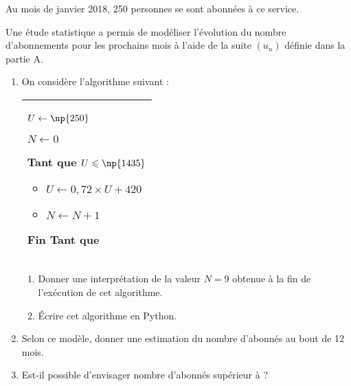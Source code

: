 \documentclass[12pt,a4paper]{article}
\theoremstyle{break}
\begin{document}
	Au mois de janvier 2018, 250 personnes se sont abonnées à ce service.
	
	Une étude statistique a permis de modéliser l'évolution du nombre d'abonnements pour les prochains mois à l'aide de la suite $\left(u_{n}\right)$ définie dans la partie A.
	
	\begin{enumerate}
		\item On considère l'algorithme suivant :
		\begin{center}
			\begin{tabular}{|l|}
				\hline
					\begin{minipage}{.3\linewidth}
					
					$U \gets \np{250}$
					
					$N \leftarrow  0$
					
					Tant que  $U \leqslant \np{1435}$
					
					\begin{itemize}
						\item[] $U \leftarrow 0,72 \times U + 420$
						\item[] $N \leftarrow N+1$
					\end{itemize}
					Fin Tant que
				\end{minipage}\\
			\hline	
			\end{tabular}
		
				
		\end{center}
		\begin{enumerate}
			\item Donner une interprétation de la valeur $N=9$ obtenue à la fin de l'exécution de cet algorithme.
		\item Écrire cet algorithme en Python.
		\end{enumerate}
	
		\item Selon ce modèle, donner une estimation du nombre d'abonnés au bout de 12 mois.
		\item Est-il possible d'envisager nombre d'abonnés supérieur à  ?
	\end{enumerate}
\end{document}
